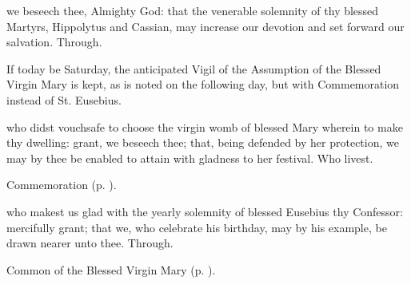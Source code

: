 \memorialCollect\label{HippolytusCassianCollect}
 we beseech thee, Almighty God: that the venerable solemnity of thy blessed Martyrs, Hippolytus and Cassian, may increase our devotion and set forward our salvation. Through.

\begin{rubric}
	If today be Saturday, the anticipated Vigil of the Assumption of the Blessed Virgin Mary is kept, as is noted on the following day, but with Commemoration  instead of St. Eusebius.
\end{rubric}




{} who didst vouchsafe to choose the virgin womb of blessed Mary wherein to make thy dwelling: grant, we beseech thee; that, being defended by her protection, we may by thee be enabled to attain with gladness to her festival. Who livest.

\begin{rubric}
	Commemoration  (p. \pageref{EusebiusCollect}).
\end{rubric}


\clearpage
{}

\memorialCollect\label{EusebiusCollect}
 who makest us glad with the yearly solemnity of blessed Eusebius thy Confessor: mercifully grant; that we, who celebrate his birthday, may by his example, be drawn nearer unto thee. Through.



\begin{rubric}
	Common of the Blessed Virgin Mary (p. \pageref{CommonBVM}).
\end{rubric}


\firstEvensong
{}

